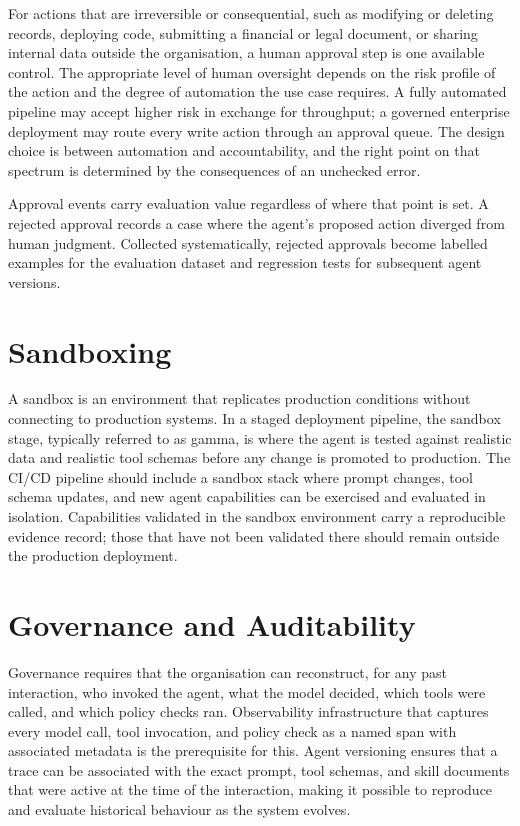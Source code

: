 For actions that are irreversible or consequential, such as modifying or deleting records,
deploying code, submitting a financial or legal document, or sharing internal data
outside the organisation, a human approval step is one available control. The
appropriate level of human oversight depends on the risk profile of the action and the
degree of automation the use case requires. A fully automated pipeline may accept higher
risk in exchange for throughput; a governed enterprise deployment may route every write
action through an approval queue. The design choice is between automation and
accountability, and the right point on that spectrum is determined by the consequences
of an unchecked error.

Approval events carry evaluation value regardless of where that point is set. A rejected
approval records a case where the agent's proposed action diverged from human judgment.
Collected systematically, rejected approvals become labelled examples for the evaluation
dataset and regression tests for subsequent agent versions.

\section{Sandboxing}

A sandbox is an environment that replicates production conditions without connecting to
production systems. In a staged deployment pipeline, the sandbox stage, typically
referred to as gamma, is where the agent is tested against realistic data and realistic
tool schemas before any change is promoted to production. The CI/CD pipeline should
include a sandbox stack where prompt changes, tool schema updates, and new agent
capabilities can be exercised and evaluated in isolation. Capabilities validated in the
sandbox environment carry a reproducible evidence record; those that have not been
validated there should remain outside the production deployment.

\section{Governance and Auditability}

Governance requires that the organisation can reconstruct, for any past interaction, who
invoked the agent, what the model decided, which tools were called, and which policy
checks ran. Observability infrastructure that captures every model call, tool invocation,
and policy check as a named span with associated metadata is the prerequisite for this.
Agent versioning ensures that a trace can be associated with the exact prompt, tool
schemas, and skill documents that were active at the time of the interaction, making it
possible to reproduce and evaluate historical behaviour as the system evolves.

